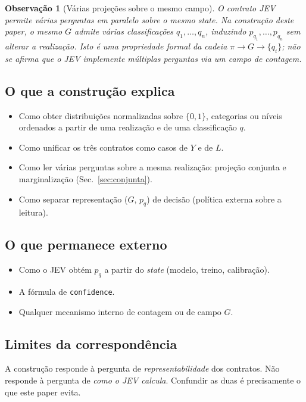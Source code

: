 \documentclass[11pt,a4paper]{article}
\newtheorem{observacao}{Observação}
\begin{document}
\begin{observacao}[Várias projeções sobre o mesmo campo]
\label{obs:multi-q}
O contrato JEV permite várias perguntas em paralelo sobre o mesmo
\textit{state}. Na construção deste paper, o mesmo \(G\) admite várias
classificações \(q_1,\dots,q_n\), induzindo \(p_{q_1},\dots,p_{q_n}\) sem
alterar a realização. Isto é uma propriedade formal da cadeia
\(\pi\to G\to\{q_i\}\); não se afirma que o JEV implemente múltiplas
perguntas via um campo de contagem.
\end{observacao}

\subsection{O que a construção explica}

\begin{itemize}[leftmargin=1.5em]
\item Como obter distribuições normalizadas sobre \(\{0,1\}\), categorias ou
níveis ordenados a partir de uma realização e de uma classificação \(q\).
\item Como unificar os três contratos como casos de \(Y\) e de \(L\).
\item Como ler várias perguntas sobre a mesma realização: projeção conjunta
e marginalização (Sec.~\ref{sec:conjunta}).
\item Como separar representação (\(G\), \(p_q\)) de decisão (política
externa sobre a leitura).
\end{itemize}

\subsection{O que permanece externo}

\begin{itemize}[leftmargin=1.5em]
\item Como o JEV obtém \(p_q\) a partir do \emph{state} (modelo, treino,
calibração).
\item A fórmula de \texttt{confidence}.
\item Qualquer mecanismo interno de contagem ou de campo \(G\).
\end{itemize}

\subsection{Limites da correspondência}

A construção responde à pergunta de \emph{representabilidade} dos contratos.
Não responde à pergunta de \emph{como o JEV calcula}. Confundir as duas é
precisamente o que este paper evita.
\end{document}
